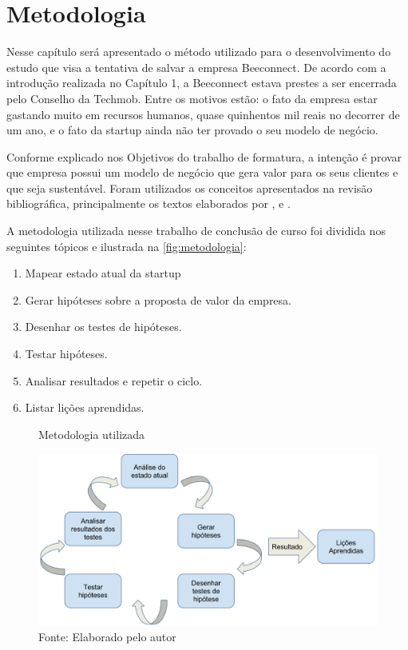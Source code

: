 \chapter[Metodologia]{Metodologia}
\label{chap:metodologia}
Nesse capítulo será apresentado o método utilizado para o desenvolvimento do estudo que visa a tentativa de salvar a empresa Beeconnect. De acordo com a introdução realizada no Capítulo 1, a Beeconnect estava prestes a ser encerrada pelo Conselho da Techmob. Entre os motivos estão: o fato da empresa estar gastando muito em recursos humanos, quase quinhentos mil reais no decorrer de um ano, e o fato da startup ainda não ter provado o seu modelo de negócio.

Conforme explicado nos Objetivos do trabalho de formatura, a intenção é provar que empresa possui um modelo de negócio que gera valor para os seus clientes e que seja sustentável. Foram utilizados os conceitos apresentados na revisão bibliográfica, principalmente os textos elaborados por ,  e .

A metodologia utilizada nesse trabalho de conclusão de curso foi dividida nos seguintes tópicos e ilustrada na \autoref{fig:metodologia}:
\begin{enumerate}
\item Mapear estado atual da startup
\item Gerar hipóteses sobre a proposta de valor da empresa.
\item Desenhar os testes de hipóteses.
\item Testar hipóteses.
\item Analisar resultados e repetir o ciclo.
\item Listar lições aprendidas.
\end{enumerate}

\begin{figure}[H]
\caption{Metodologia utilizada}
\centerline{\includegraphics[scale=0.25]{img/metodologia}}
\label{fig:metodologia}
\caption* {Fonte: Elaborado pelo autor}
\end{figure}


